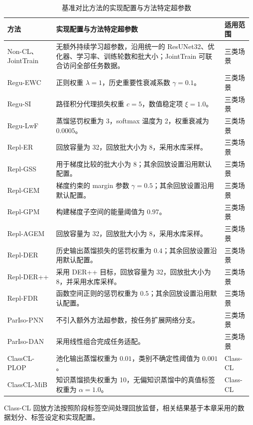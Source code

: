 \begin{table}[htbp]
\centering
\caption{基准对比方法的实现配置与方法特定超参数}
\label{tab:benchmark-baseline-config}
\thesistablefont
\renewcommand{\arraystretch}{1.08}
\setlength{\tabcolsep}{3pt}
\begin{tabular}{p{2.45cm}p{8.70cm}p{2.20cm}}
\toprule
方法 & 实现配置与方法特定超参数 & 适用范围 \\
\midrule
Non-CL、JointTrain & 无额外持续学习超参数，沿用统一的 ResUNet32、优化器、学习率、训练轮数和批大小；JointTrain 可联合访问全部任务数据。 & 三类场景 \\
Regu-EWC & 正则权重 $\lambda=1$，历史重要性衰减系数 $\gamma=0.1$。 & 三类场景 \\
Regu-SI & 路径积分代理损失权重 $c=5$，数值稳定项 $\xi=1.0$。 & 三类场景 \\
Regu-LwF & 蒸馏惩罚权重为 3，softmax 温度为 2，权重衰减为 $0.0005$。 & 三类场景 \\
Repl-ER & 回放容量为 32，回放批大小为 8，采用水库采样。 & 三类场景 \\
Repl-GSS & 用于梯度比较的批大小为 8；其余回放设置沿用默认配置。 & 三类场景 \\
Repl-GEM & 梯度约束的 margin 参数 $\gamma=0.5$；其余回放设置沿用默认配置。 & 三类场景 \\
Repl-GPM & 构建梯度子空间的能量阈值为 $0.97$。 & 三类场景 \\
Repl-AGEM & 回放容量为 32，回放批大小为 8，采用水库采样。 & 三类场景 \\
Repl-DER & 历史输出蒸馏损失的惩罚权重为 $0.4$；其余回放设置沿用默认配置。 & 三类场景 \\
Repl-DER++ & 采用 DER++ 目标，回放容量为 32，回放批大小为 8，并采用水库采样。 & 三类场景 \\
Repl-FDR & 函数空间正则的惩罚权重为 $0.5$；其余回放设置沿用默认配置。 & 三类场景 \\
ParIso-PNN & 不引入额外方法超参数，按任务扩展网络分支。 & 三类场景 \\
ParIso-DAN & 采用线性组合完成任务适配。 & 三类场景 \\
ClassCL-PLOP & 池化输出蒸馏权重为 $0.01$，类别不确定性阈值为 $0.001$。 & Class-CL \\
ClassCL-MiB & 知识蒸馏损失权重为 10，无偏知识蒸馏中的真值标签权重为 $\alpha=1.0$。 & Class-CL \\
\bottomrule
\end{tabular}
\end{table}

Class-CL 回放方法按照阶段标签空间处理回放监督，相关结果基于本章采用的数据划分、标签设定和实现配置。

